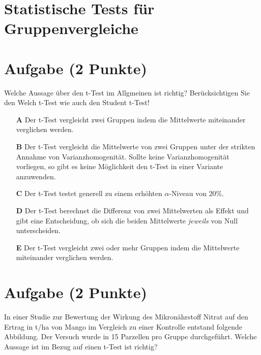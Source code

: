 \documentclass[a4paper, 9pt]{scrartcl}\usepackage[]{graphicx}\usepackage[]{xcolor}
\begin{document}
\section*{Statistische Tests für Gruppenvergleiche} 

\section{Aufgabe \hfill (2 Punkte)}



Welche Aussage über den t-Test im Allgmeinen ist richtig? Berücksichtigen Sie den Welch t-Test wie auch den Student t-Test!



\begin{enumerate}
\item [\textbf{A} \msquare] Der t-Test vergleicht zwei Gruppen indem die Mittelwerte miteinander verglichen werden.
\item [\textbf{B} \msquare] Der t-Test vergleicht die Mittelwerte von zwei Gruppen unter der strikten Annahme von Varianzhomogenität. Sollte keine Varianzhomogenität vorliegen, so gibt es keine Möglichkeit den t-Test in einer Variante anzuwenden.
\item [\textbf{C} \msquare] Der t-Test testet generell zu einem erhöhten $\alpha$-Niveau von 20\%.
\item [\textbf{D} \msquare] Der t-Test berechnet die Differenz von zwei Mittelwerten als Effekt und gibt eine Entscheidung, ob sich die beiden Mittelwerte \textit{jeweils} von Null unterscheiden.
\item [\textbf{E} \msquare] Der t-Test vergleicht zwei oder mehr Gruppen indem die Mittelwerte miteinander verglichen werden.
\end{enumerate}

\section{Aufgabe \hfill (2 Punkte)}



In einer Studie zur Bewertung der Wirkung des Mikronährstoff Nitrat auf den Ertrag in t/ha  von Mango im Vergleich zu einer Kontrolle entstand folgende Abbildung. Der Versuch wurde in 15 Parzellen pro Gruppe durchgeführt. Welche Aussage ist im Bezug auf einen t-Test ist richtig?
\end{document}
